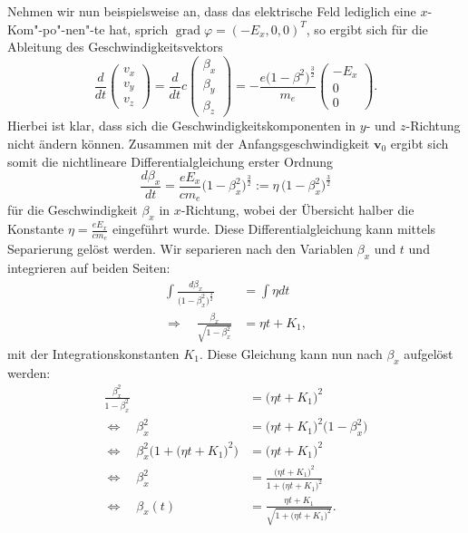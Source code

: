 Nehmen wir nun beispielsweise an,
dass das elektrische Feld lediglich eine \(x\)-Kom"-po"-nen"-te hat,
sprich \( \operatorname{grad} \varphi = (-E_x, 0, 0)^T \),
so ergibt sich für die Ableitung des Geschwindigkeitsvektors
\begin{equation}
    \frac{d}{dt}
    \begin{pmatrix}
        v_x \\
        v_y \\
        v_z
    \end{pmatrix} =
    \frac{d}{dt} c
    \begin{pmatrix}
        \beta_x \\
        \beta_y \\
        \beta_z
    \end{pmatrix} =
    - \frac{e \bigl(1-\beta^2\bigr)^\frac{3}{2}}{m_e}
    \begin{pmatrix}
        -E_x \\
        0 \\
        0
    \end{pmatrix}.
    \label{relativ:eqn:bsp-abl-v-vec}
\end{equation}
Hierbei ist klar, dass sich die Geschwindigkeitskomponenten
in \(y\)- und \(z\)-Richtung nicht ändern können.
Zusammen mit der Anfangsgeschwindigkeit \(\bm{v}_0\)
ergibt sich somit die nichtlineare Differentialgleichung erster Ordnung
\begin{equation}
    \frac{d\beta_x}{dt} = \frac{e E_x}{c m_e} \bigl(1-\beta_x^2\bigr)^\frac{3}{2}
    := \eta \, \bigl(1-\beta_x^2\bigr)^\frac{3}{2}
\end{equation}
für die Geschwindigkeit \(\beta_x\) in \(x\)-Richtung,
wobei der Übersicht halber die Konstante
\(\eta=\frac{e E_x}{c m_e}\) eingeführt wurde.
Diese Differentialgleichung kann mittels Separierung gelöst werden.
Wir separieren nach den Variablen \(\beta_x\) und \(t\)
und integrieren auf beiden Seiten:
\begin{align*}
    \int\frac{d\beta_x}{\bigl(1-\beta_x^2\bigr)^\frac{3}{2}}
    &= \int\eta dt \\
    \Rightarrow\quad\frac{\beta_x}{\sqrt{1-\beta_x^2}}
    &= \eta t + K_1,
\end{align*}
mit der Integrationskonstanten \(K_1\).
Diese Gleichung kann nun nach \(\beta_x\) aufgelöst werden:
\begin{align*}
    \frac{\beta_x^2}{1-\beta_x^2}
    &= \bigl(\eta t + K_1\bigr)^2\\
    \Leftrightarrow\quad \beta_x^2 &= \bigl(\eta t + K_1\bigr)^2
    \bigl(1-\beta_x^2\bigr)\\
    \Leftrightarrow\quad
    \beta_x^2 \bigl(1 + \bigl(\eta t + K_1\bigr)^2\bigr)
    &= \bigl(\eta t + K_1\bigr)^2\\
    \Leftrightarrow\quad
    \beta_x^2 &= \frac{\bigl(\eta t + K_1\bigr)^2}
    {1 + \bigl(\eta t + K_1\bigr)^2}\\
    \Leftrightarrow\quad
    \beta_x(t) &= \frac{\eta t + K_1}
    {\sqrt{1+\bigl(\eta t+K_1\bigr)^2}}.
\end{align*}

